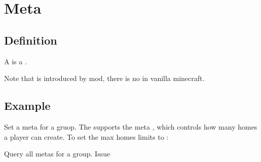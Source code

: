 \chapter{Meta}\label{ch:meta}
\section{Definition}
A  is a .

\begin{note}{}
    Note that  is introduced by  mod, there is no  in vanilla minecraft.
\end{note}


\section{Example}{}
\begin{example}{Set a meta for a gruop.}
    The  supports the meta , which controls how many homes a player can create.
    To set the max homes limits to : 
\end{example}

\begin{example}{Query all metas for a group.}
    Issue 
\end{example}